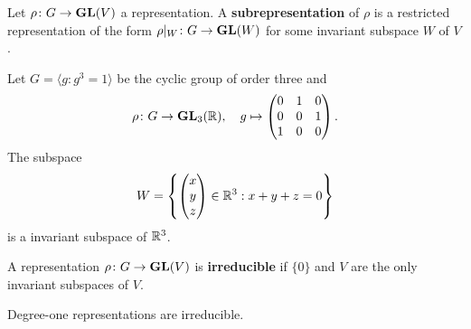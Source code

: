 \begin{definition}
    Let $\rho\colon G\to\mathbf{GL}(V)$
    a representation. A \textbf{subrepresentation} of $\rho$ is a restricted representation 
    of the form $\rho|_W\colon G\to\mathbf{GL}(W)$ for some invariant subspace $W$ of $V$.
\end{definition}

\begin{example}
    Let $G=\langle g:g^3=1\rangle$ be the
    cyclic group of order three
    and
    \[
    \rho\colon G\to\mathbf{GL}_3(\mathbb{R}),
    \quad
    g\mapsto\begin{pmatrix}
        0&1&0\\
        0&0&1\\
        1&0&0
    \end{pmatrix}.
    \]
    The subspace
    \[
    W=\left\{
    \begin{pmatrix}
    x\\
    y\\
    z
    \end{pmatrix}\in\mathbb{R}^3:x+y+z=0\right\}
    \]
    is a invariant subspace of $\mathbb{R}^3$.
\end{example}

\begin{definition}
    A representation $\rho\colon G\to\mathbf{GL}(V)$ is \textbf{irreducible} if
    $\{0\}$ and $V$ are the only invariant subspaces of $V$.
\end{definition}

Degree-one representations are irreducible.

